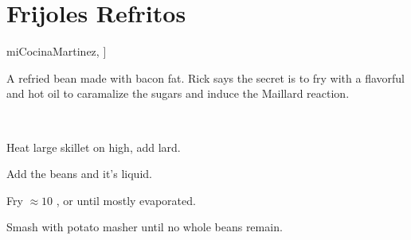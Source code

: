 \section{Frijoles Refritos}\label{frijoles_refritos}


\begin{recipestats}[
	preptime=5 \minute,
	servings=6 C,
	bakingtime=20 \minute,
	original=\citeauthor{miCocinaMartinez}~\cite[p.55]{miCocinaMartinez},
]
\end{recipestats}


\begin{recipeabstract}
	A refried bean made with bacon fat.
	Rick says the secret is to fry with a flavorful and hot oil to caramalize the sugars and induce the Maillard reaction.
\end{recipeabstract}


\begin{ingredientcolumns}[1]
	\begin{ingredientblock}
		\\
	\end{ingredientblock}
\end{ingredientcolumns}


\begin{preparation}
	\item Heat large skillet on high, add lard.
	\item Add the beans and it's liquid.
	\item Fry $\approx 10$ \minute, or until mostly evaporated.
	\item Smash with potato masher until no whole beans remain.
\end{preparation}


\recipeend%
